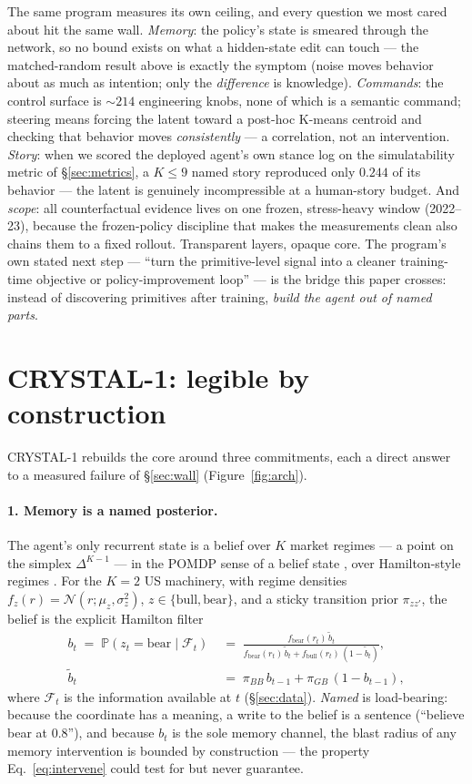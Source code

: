 \documentclass[11pt]{article}
\newcommand{\Prob}{\mathbb{P}}
\begin{document}
The same program measures its own ceiling, and every question we most cared about hit the same
wall. \emph{Memory}: the policy's state is smeared through the network, so no bound exists on
what a hidden-state edit can touch --- the matched-random result above is exactly the symptom
(noise moves behavior about as much as intention; only the \emph{difference} is knowledge).
\emph{Commands}: the control surface is ${\sim}214$ engineering knobs, none of which is a
semantic command; steering means forcing the latent toward a post-hoc K-means centroid and
checking that behavior moves \emph{consistently} --- a correlation, not an intervention.
\emph{Story}: when we scored the deployed agent's own stance log on the simulatability metric of
\S\ref{sec:metrics}, a $K{\le}9$ named story reproduced only $0.244$ of its behavior --- the
latent is genuinely incompressible at a human-story budget. And \emph{scope}: all counterfactual
evidence lives on one frozen, stress-heavy window (2022--23), because the frozen-policy
discipline that makes the measurements clean also chains them to a fixed rollout. Transparent
layers, opaque core. The program's own stated next step --- ``turn the primitive-level signal into a cleaner
training-time objective or policy-improvement loop'' --- is the bridge this paper crosses: instead of discovering
primitives after training, \emph{build the agent out of named parts}.

\section{CRYSTAL-1: legible by construction}
\label{sec:crystal}

CRYSTAL-1 rebuilds the core around three commitments, each a direct answer to a measured
failure of \S\ref{sec:wall} (Figure~\ref{fig:arch}).

\paragraph{1. Memory is a named posterior.} The agent's only recurrent state is a belief over
$K$ market regimes --- a point on the simplex $\Delta^{K-1}$ --- in the POMDP sense of a belief
state \citep{kaelbling1998}, over Hamilton-style regimes \citep{hamilton1989}. For the $K{=}2$
US machinery, with regime densities $f_z(r) = \mathcal{N}(r;\mu_z,\sigma_z^2)$,
$z\in\{\text{bull},\text{bear}\}$, and a sticky transition prior $\pi_{zz'}$, the belief is the
explicit Hamilton filter
\begin{align}
b_t \;=\; \Prob(z_t = \text{bear}\mid \mathcal{F}_t)
\;&=\; \frac{f_{\text{bear}}(r_t)\,\tilde b_t}
{f_{\text{bear}}(r_t)\,\tilde b_t + f_{\text{bull}}(r_t)\,(1-\tilde b_t)},
\label{eq:belief}\\
\tilde b_t \;&=\; \pi_{BB}\, b_{t-1} + \pi_{GB}\,(1-b_{t-1}),\nonumber
\end{align}
where $\mathcal{F}_t$ is the information available at $t$ (\S\ref{sec:data}). \emph{Named} is
load-bearing: because the coordinate has a meaning, a write to the belief is a sentence
(``believe bear at $0.8$''), and because $b_t$ is the sole memory channel, the blast radius of
any memory intervention is bounded by construction --- the property Eq.~\ref{eq:intervene}
could test for but never guarantee.
\end{document}
